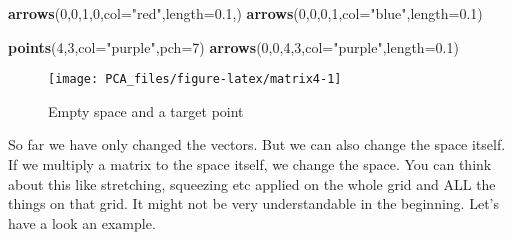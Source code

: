 \documentclass[
]{book}
\newenvironment{Shaded}{\begin{snugshade}}{\end{snugshade}}
\newcommand{\DataTypeTok}[1]{\textcolor[rgb]{0.13,0.29,0.53}{#1}}
\newcommand{\DecValTok}[1]{\textcolor[rgb]{0.00,0.00,0.81}{#1}}
\newcommand{\FloatTok}[1]{\textcolor[rgb]{0.00,0.00,0.81}{#1}}
\newcommand{\KeywordTok}[1]{\textcolor[rgb]{0.13,0.29,0.53}{\textbf{#1}}}
\newcommand{\NormalTok}[1]{#1}
\newcommand{\StringTok}[1]{\textcolor[rgb]{0.31,0.60,0.02}{#1}}
\theoremstyle{definition}
\theoremstyle{definition}
\theoremstyle{definition}
\theoremstyle{remark}
\begin{document}
\begin{Shaded}
\begin{Highlighting}[]
\KeywordTok{arrows}\NormalTok{(}\DecValTok{0}\NormalTok{,}\DecValTok{0}\NormalTok{,}\DecValTok{1}\NormalTok{,}\DecValTok{0}\NormalTok{,}\DataTypeTok{col=}\StringTok{"red"}\NormalTok{,}\DataTypeTok{length=}\FloatTok{0.1}\NormalTok{,)}
\KeywordTok{arrows}\NormalTok{(}\DecValTok{0}\NormalTok{,}\DecValTok{0}\NormalTok{,}\DecValTok{0}\NormalTok{,}\DecValTok{1}\NormalTok{,}\DataTypeTok{col=}\StringTok{"blue"}\NormalTok{,}\DataTypeTok{length=}\FloatTok{0.1}\NormalTok{)}

\KeywordTok{points}\NormalTok{(}\DecValTok{4}\NormalTok{,}\DecValTok{3}\NormalTok{,}\DataTypeTok{col=}\StringTok{"purple"}\NormalTok{,}\DataTypeTok{pch=}\DecValTok{7}\NormalTok{)}
\KeywordTok{arrows}\NormalTok{(}\DecValTok{0}\NormalTok{,}\DecValTok{0}\NormalTok{,}\DecValTok{4}\NormalTok{,}\DecValTok{3}\NormalTok{,}\DataTypeTok{col=}\StringTok{"purple"}\NormalTok{,}\DataTypeTok{length=}\FloatTok{0.1}\NormalTok{)}
\end{Highlighting}
\end{Shaded}

\begin{figure}

{\centering \texttt{[image: PCA\_files/figure-latex/matrix4-1]} 

}

\caption{Empty space and a target point}\label{fig:matrix4}
\end{figure}

So far we have only changed the vectors. But we can also change the space itself. If we multiply a matrix to the space itself, we change the space. You can think about this like stretching, squeezing etc applied on the whole grid and ALL the things on that grid. It might not be very understandable in the beginning. Let's have a look an example.
\end{document}
